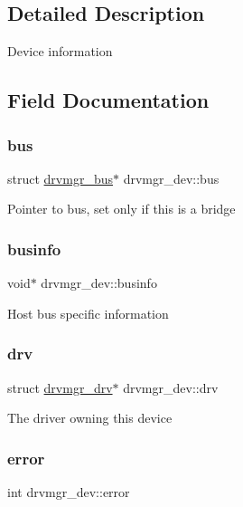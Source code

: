 \subsection{Detailed Description}
Device information 

\subsection{Field Documentation}
\mbox{\label{structdrvmgr__dev_a07923db7c70d3287d70849ba1b16acb2}} 
\subsubsection{\texorpdfstring{bus}{bus}}
{\footnotesize\ttfamily struct \mbox{\hyperlink{structdrvmgr__bus}{drvmgr\+\_\+bus}}$\ast$ drvmgr\+\_\+dev\+::bus}

Pointer to bus, set only if this is a bridge \mbox{\label{structdrvmgr__dev_acdae19c81d1111a8dc952501c9519254}} 
\subsubsection{\texorpdfstring{businfo}{businfo}}
{\footnotesize\ttfamily void$\ast$ drvmgr\+\_\+dev\+::businfo}

Host bus specific information \mbox{\label{structdrvmgr__dev_a73a4618b4456ddad5a5f31ebb830e657}} 
\subsubsection{\texorpdfstring{drv}{drv}}
{\footnotesize\ttfamily struct \mbox{\hyperlink{structdrvmgr__drv}{drvmgr\+\_\+drv}}$\ast$ drvmgr\+\_\+dev\+::drv}

The driver owning this device \mbox{\label{structdrvmgr__dev_aa3e438d71e595a06f73d39b58cb78828}} 
\subsubsection{\texorpdfstring{error}{error}}
{\footnotesize\ttfamily int drvmgr\+\_\+dev\+::error}

